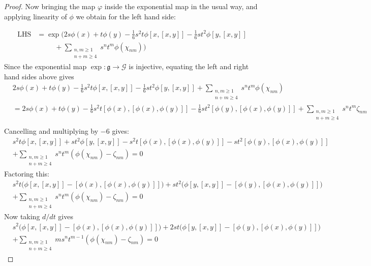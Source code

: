 \documentclass[honours]{UNSWthesis}
\newcommand{\G}{\mathcal{G}}
\newcommand{\g}{\mathfrak{g}}
\newcommand{\1}{\mathbf{e}_{1}}
\newcommand{\2}{\mathbf{e}_{3}}
\newcommand{\3}{\mathbf{e}_{3}}
\begin{document}
\begin{proof}
Now bringing the map $\varphi$ inside the exponential map in the usual way, and applying linearity of $\phi$ we obtain for the left hand side:

\begin{align*}
\text{LHS} &=  \exp \bigg( 
2s\phi(x)+t\phi(y)-\frac{1}{6}s^{2}t\phi[x,[x,y]] -\frac{1}{6}st^{2}\phi[y,[x,y]] \\
&\;\;\;\;\;\;\;\;\;  +\sum\limits_{\substack{n,m \geq 1  \\ n+m \geq 4}} s^{n}t^{m}\phi(\chi_{nm}) \bigg)
\end{align*}
Since the exponential map $\exp: \g \longrightarrow \G$ is injective, equating the left and right hand sides above gives
\begin{align*}
&2s\phi(x)+t\phi(y)-\frac{1}{6}s^{2}t\phi[x,[x,y]] -\frac{1}{6}st^{2}\phi[y,[x,y]]+\sum\limits_{\substack{n,m \geq 1  \\ n+m \geq 4}}s^{n}t^{m}\phi(\chi_{nm}) \\
&=2s\phi(x)+t\phi(y)-\frac{1}{6}s^{2}t[\phi(x),[\phi(x),\phi(y)]] -\frac{1}{6}st^{2}[\phi(y),[\phi(x),\phi(y)]]+\sum\limits_{\substack{n,m \geq 1  \\ n+m \geq 4}}s^{n}t^{m}\zeta_{nm} \\
\end{align*}
Cancelling and multiplying by $-6$ gives:
\begin{align*}
&s^{2}t\phi[x,[x,y]]+st^{2}\phi[y,[x,y]]-s^{2}t[\phi(x),[\phi(x),\phi(y)]]-st^{2}[\phi(y),[\phi(x),\phi(y)]] \\
&+\sum\limits_{\substack{n,m \geq 1\\ n+m \geq 4}}s^{n}t^{m}(\phi(\chi_{nm})- \zeta_{nm})=0
\end{align*}
Factoring this:
\begin{align*}
&s^{2}t\big(\phi[x,[x,y]]-[\phi(x),[\phi(x),\phi(y)]]\big)+st^{2}\big(\phi[y,[x,y]]-[\phi(y),[\phi(x),\phi(y)]]\big) \\
&+\sum\limits_{\substack{n,m \geq 1\\ n+m \geq 4}}s^{n}t^{m}(\phi(\chi_{nm})- \zeta_{nm})=0
\end{align*}
Now taking $d/dt$ gives
\begin{align*}
&s^{2}\big(\phi[x,[x,y]]-[\phi(x),[\phi(x),\phi(y)]]\big)+2st\big(\phi[y,[x,y]]-[\phi(y),[\phi(x),\phi(y)]]\big) \\
&+\sum\limits_{\substack{n,m \geq 1\\ n+m \geq 4}}m s^{n}t^{m-1}(\phi(\chi_{nm})- \zeta_{nm})=0
\end{align*}

\end{proof}
\end{document}
